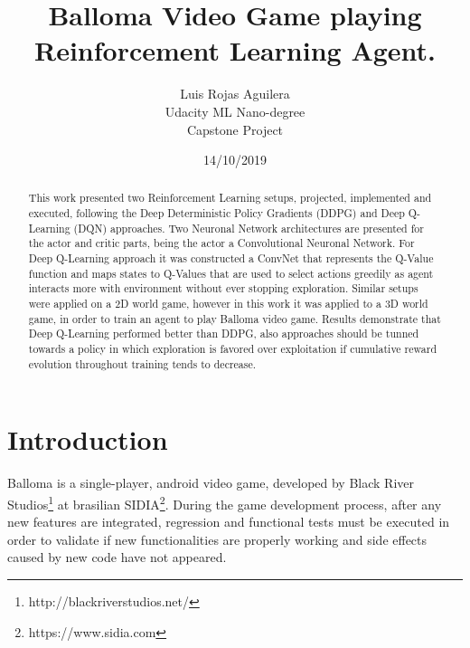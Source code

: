 \documentclass[peerreview,onecolumn]{IEEEtran}
\begin{document}
\title{Balloma Video Game playing Reinforcement Learning Agent.}



\author{Luis Rojas Aguilera \\
Udacity ML Nano-degree\\
Capstone Project\\
}
\date{14/10/2019}

\maketitle
\tableofcontents
\listoffigures
\listoftables

\IEEEpeerreviewmaketitle
\begin{abstract}


This work presented two Reinforcement Learning setups, projected, implemented and executed, following the Deep Deterministic Policy Gradients (DDPG) \cite{ddpg_2015} and Deep Q-Learning (DQN) \cite{replay_buffer_2015} approaches. Two Neuronal Network architectures are presented for the actor and critic parts, being the actor a Convolutional Neuronal Network. For Deep Q-Learning approach it was constructed a ConvNet that represents the Q-Value function and maps states to Q-Values that are used to select actions greedily as agent interacts more with environment without ever stopping exploration. Similar setups were applied on a 2D world game, however in this work it was applied to a 3D world game, in order to train an agent to play Balloma video game. Results demonstrate that Deep Q-Learning performed better than DDPG, also approaches should be tunned towards a policy in which exploration is favored over exploitation if cumulative reward evolution throughout training tends to decrease. 
	
\end{abstract}


\section{Introduction}
Balloma is a single-player, android video game, developed by Black River Studios\footnote{http://blackriverstudios.net/} at brasilian SIDIA\footnote{https://www.sidia.com}.  During the game development process, after any new features are integrated, regression and functional tests must be executed in order to validate if new functionalities are properly working and side effects caused by new code have not appeared. 
\end{document}
